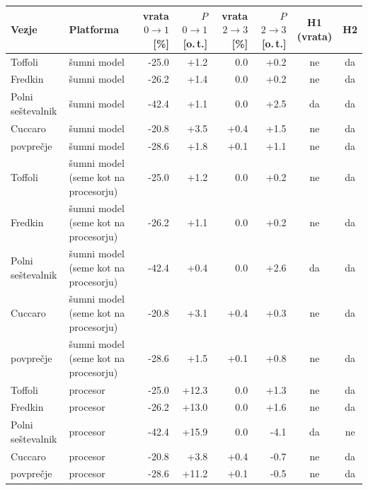 \begin{tabular}{llrrrrcc}
\toprule
Vezje & Platforma & vrata $0\to1$ [\%] & $P$ $0\to1$ [o.\,t.] & vrata $2\to3$ [\%] & $P$ $2\to3$ [o.\,t.] & H1 (vrata) & H2 \\
\midrule
Toffoli & šumni model & -25.0 & +1.2 & 0.0 & +0.2 & ne & da \\
Fredkin & šumni model & -26.2 & +1.4 & 0.0 & +0.2 & ne & da \\
Polni seštevalnik & šumni model & -42.4 & +1.1 & 0.0 & +2.5 & da & da \\
Cuccaro & šumni model & -20.8 & +3.5 & +0.4 & +1.5 & ne & da \\
povprečje & šumni model & -28.6 & +1.8 & +0.1 & +1.1 & ne & da \\
Toffoli & šumni model (seme kot na procesorju) & -25.0 & +1.2 & 0.0 & +0.2 & ne & da \\
Fredkin & šumni model (seme kot na procesorju) & -26.2 & +1.1 & 0.0 & +0.2 & ne & da \\
Polni seštevalnik & šumni model (seme kot na procesorju) & -42.4 & +0.4 & 0.0 & +2.6 & da & da \\
Cuccaro & šumni model (seme kot na procesorju) & -20.8 & +3.1 & +0.4 & +0.3 & ne & da \\
povprečje & šumni model (seme kot na procesorju) & -28.6 & +1.5 & +0.1 & +0.8 & ne & da \\
Toffoli & procesor & -25.0 & +12.3 & 0.0 & +1.3 & ne & da \\
Fredkin & procesor & -26.2 & +13.0 & 0.0 & +1.6 & ne & da \\
Polni seštevalnik & procesor & -42.4 & +15.9 & 0.0 & -4.1 & da & ne \\
Cuccaro & procesor & -20.8 & +3.8 & +0.4 & -0.7 & ne & da \\
povprečje & procesor & -28.6 & +11.2 & +0.1 & -0.5 & ne & da \\
\bottomrule
\end{tabular}
